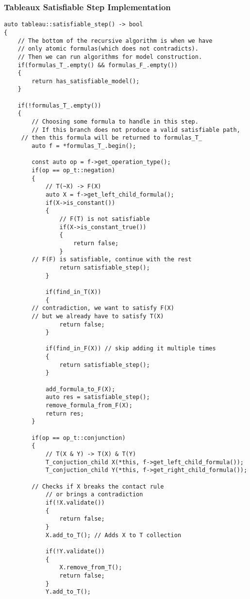 \documentclass{article}
\begin{document}
			\subsubsection*{Tableaux Satisfiable Step Implementation}
				\begin{lstlisting}
auto tableau::satisfiable_step() -> bool
{
    // The bottom of the recursive algorithm is when we have 
    // only atomic formulas(which does not contradicts). 
    // Then we can run algorithms for model construction.
    if(formulas_T_.empty() && formulas_F_.empty())
    {
        return has_satisfiable_model();
    }

    if(!formulas_T_.empty())
    {
        // Choosing some formula to handle in this step.
        // If this branch does not produce a valid satisfiable path,
	 // then this formula will be returned to formulas_T_
        auto f = *formulas_T_.begin();

        const auto op = f->get_operation_type();
        if(op == op_t::negation)
        {
            // T(~X) -> F(X)
            auto X = f->get_left_child_formula();
            if(X->is_constant())
            {
                // F(T) is not satisfiable
                if(X->is_constant_true())
                {
                    return false;
                }
		// F(F) is satisfiable, continue with the rest
                return satisfiable_step(); 
            }

            if(find_in_T(X))
            {
		// contradiction, we want to satisfy F(X) 
		// but we already have to satisfy T(X)
                return false;
            }

            if(find_in_F(X)) // skip adding it multiple times
            {
                return satisfiable_step();
            }

            add_formula_to_F(X);
            auto res = satisfiable_step();
            remove_formula_from_F(X);
            return res;
        }

        if(op == op_t::conjunction)
        {
            // T(X & Y) -> T(X) & T(Y)
            T_conjuction_child X(*this, f->get_left_child_formula());
            T_conjuction_child Y(*this, f->get_right_child_formula());
		
	    // Checks if X breaks the contact rule 
            // or brings a contradiction
            if(!X.validate()) 
            {
                return false;
            }
            X.add_to_T(); // Adds X to T collection

            if(!Y.validate())
            {
                X.remove_from_T();
                return false;
            }
            Y.add_to_T();


\end{lstlisting}
\end{document}
